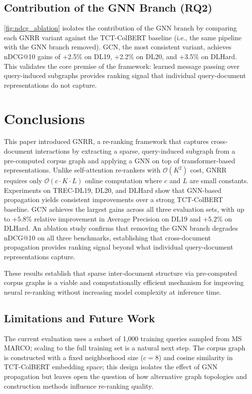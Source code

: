 \documentclass[runningheads]{llncs}
\newcommand{\ModelName}{\textsc{GNRR}\xspace}
\begin{document}
\subsection*{Contribution of the GNN Branch (RQ2)}
\cref{fig:ndcg_ablation} isolates the contribution of the GNN branch by comparing each \ModelName variant against the TCT-ColBERT baseline (i.e., the same pipeline with the GNN branch removed). GCN, the most consistent variant, achieves nDCG@10 gains of +2.5\% on DL19, +2.2\% on DL20, and +3.5\% on DLHard. This validates the core premise of the framework: learned message passing over query-induced subgraphs provides ranking signal that individual query-document representations do not capture.

\section{Conclusions}
This paper introduced \ModelName, a re-ranking framework that captures cross-document interactions by extracting a sparse, query-induced subgraph from a pre-computed corpus graph and applying a GNN on top of transformer-based representations. Unlike self-attention re-rankers with $\mathcal{O}(K^2)$ cost, \ModelName requires only $\mathcal{O}(c \cdot K \cdot L)$ online computation where $c$ and $L$ are small constants. Experiments on TREC-DL19, DL20, and DLHard show that GNN-based propagation yields consistent improvements over a strong TCT-ColBERT baseline. GCN achieves the largest gains across all three evaluation sets, with up to $+5.8$\% relative improvement in Average Precision on DL19 and $+5.2$\% on DLHard. An ablation study confirms that removing the GNN branch degrades nDCG@10 on all three benchmarks, establishing that cross-document propagation provides ranking signal beyond what individual query-document representations capture.

These results establish that sparse inter-document structure via pre-computed corpus graphs is a viable and computationally efficient mechanism for improving neural re-ranking without increasing model complexity at inference time.

\subsection*{Limitations and Future Work}
The current evaluation uses a subset of 1,000 training queries sampled from MS MARCO; scaling to the full training set is a natural next step. The corpus graph is constructed with a fixed neighborhood size ($c=8$) and cosine similarity in TCT-ColBERT embedding space; this design isolates the effect of GNN propagation but leaves open the question of how alternative graph topologies and construction methods influence re-ranking quality.
\end{document}
